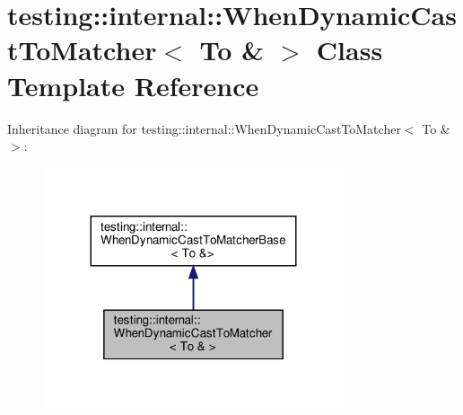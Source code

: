 \hypertarget{classtesting_1_1internal_1_1_when_dynamic_cast_to_matcher_3_01_to_01_6_01_4}{}\section{testing\+:\+:internal\+:\+:When\+Dynamic\+Cast\+To\+Matcher$<$ To \& $>$ Class Template Reference}
\label{classtesting_1_1internal_1_1_when_dynamic_cast_to_matcher_3_01_to_01_6_01_4}


Inheritance diagram for testing\+:\+:internal\+:\+:When\+Dynamic\+Cast\+To\+Matcher$<$ To \& $>$\+:
\nopagebreak
\begin{figure}[H]
\begin{center}
\leavevmode
\includegraphics[width=251pt]{classtesting_1_1internal_1_1_when_dynamic_cast_to_matcher_3_01_to_01_6_01_4__inherit__graph}
\end{center}
\end{figure}


